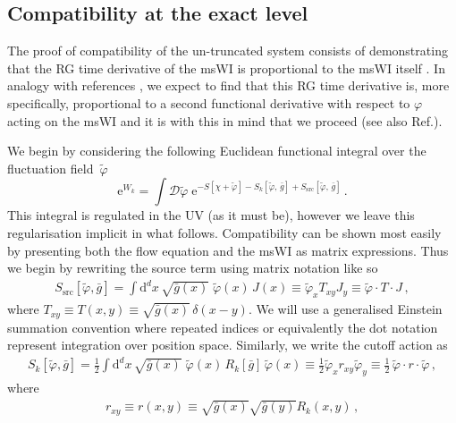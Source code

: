 \documentclass[11pt]{book} %
\numberwithin{equation}{chapter}
\begin{document}
\subsection{Compatibility at the exact level}\label{sec:exact}

The proof of compatibility of the un-truncated system consists of demonstrating that the
RG time derivative of the msWI is proportional to the msWI itself \cite{Litim:1998qi, Litim:1998wk}.
In analogy with references \cite{Litim:1998qi, Litim:1998wk},
we expect to find that this RG time derivative is, more specifically,
proportional to a second functional derivative with respect to $\varphi$ acting on
the msWI and it is with this in mind that we proceed (see also Ref.\cite{Safari:2015dva}).

We begin by considering the following Euclidean functional integral over the fluctuation field~$\tilde\varphi$
\begin{equation}
  \mathrm e^{W_k} = \int \mathcal{D}\tilde\varphi \;
  \mathrm e^{-S[\chi+\tilde\varphi]-S_k[\tilde\varphi,\, \bar g]
  + S_{\mathrm{src}}[\tilde\varphi, \, \bar g]} \,.
  \label{Z}
\end{equation}
This integral is regulated in the UV (as it must be), however we leave this regularisation implicit
in what follows. Compatibility can be shown most easily by presenting both the flow equation and the
msWI as matrix expressions. Thus we begin by rewriting the source term using matrix notation like so
\begin{align}
	S_\mathrm{src}[\tilde\varphi,\bar g] = \int \mathrm d^d x \, \sqrt{\bar g(x)} \;
  \tilde\varphi(x) \, J(x)
  \equiv \tilde\varphi_xT_{xy}J_y
  \equiv \tilde\varphi\cdot T\cdot J \,,
\end{align}
where $T_{xy}\equiv T(x,y)\equiv\sqrt{\bar g(x)} \, \delta(x-y)$. We will use a generalised
Einstein summation convention where repeated indices or equivalently the dot notation represent
integration over position space. Similarly, we write the cutoff action as
\begin{align}
  S_k[\tilde\varphi, \bar g] = \frac{1}{2} \int \mathrm d^d x \, \sqrt{\bar g(x)} \;
  \tilde\varphi(x) \, R_k[\bar g] \, \tilde\varphi(x)
  \equiv \frac{1}{2}\tilde\varphi_x r_{xy} \tilde\varphi_{y}
  \equiv\frac{1}{2}\,\tilde\varphi\cdot r \cdot\tilde\varphi \,,
  \label{cutoff-action}
\end{align}
where
\begin{align}
  r_{xy}\equiv r(x,y)\equiv\sqrt{\bar g(x)}\sqrt{\bar g(y)}R_{k}(x,y)\,,
  \label{odd-r}
\end{align}
\end{document}
